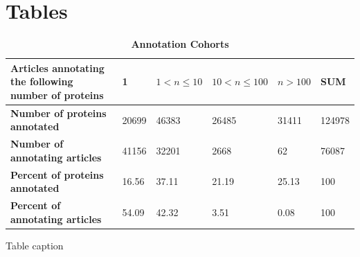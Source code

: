 \documentclass[12pt]{article}
\begin{document}
\section*{Tables}
\begin{table}[!ht]
\caption{
\bf{Annotation Cohorts}}
\begin{tabular}{||p{5cm}||l|l|l|l||l||}
\hline
Articles annotating the following number of proteins & 1 & $1<n\le 10$ & $10<n\le 100$ & $n>100$ 
& SUM \\ \hline
\textbf{Number of proteins annotated} & 20699 & 46383 & 26485 & 31411 & 124978 \\ \hline
\textbf{Number of annotating articles} & 41156 & 32201 & 2668 & 62 &  76087 \\ \hline
\textbf{Percent of proteins annotated} & 16.56 & 37.11 & 21.19 & 25.13 & 100 \\ \hline
\textbf{Percent of annotating articles} & 54.09 & 42.32 & 3.51 & 0.08 & 100 \\ \hline 
\end{tabular}
\begin{flushleft}Table caption
\end{flushleft}
\label{tab:cohorts}
\end{table}
\newpage


\label{tab:top50}
\newpage
\end{document}
